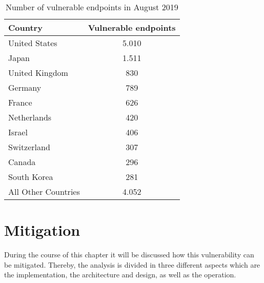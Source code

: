 \begin{center}
    \begin{table}[htbp]
        \begin{tabularx}{\linewidth}{lc}
            \toprule
            \textbf{Country}        & \textbf{Vulnerable endpoints} \\
            \toprule
            United States           & 5.010 \\ %
            Japan                   & 1.511 \\ %
            United Kingdom          & 830   \\ %
            Germany                 & 789   \\ %
            France                  & 626   \\ %
            Netherlands             & 420   \\ %
            Israel                  & 406   \\ %
            Switzerland             & 307   \\ %
            Canada                  & 296   \\ %
            South Korea             & 281   \\ %
            All Other Countries     & 4.052 \\ \bottomrule
        \end{tabularx}
        \caption{Number of vulnerable endpoints in August 2019 \autocite{BadPackets:online}}
    \end{table}
\end{center}

\section{Mitigation}
\label{mitigation}
During the course of this chapter it will be discussed how this vulnerability can be mitigated. Thereby, the analysis is divided in three different aspects which are the implementation, the architecture and design, as well as the operation.

